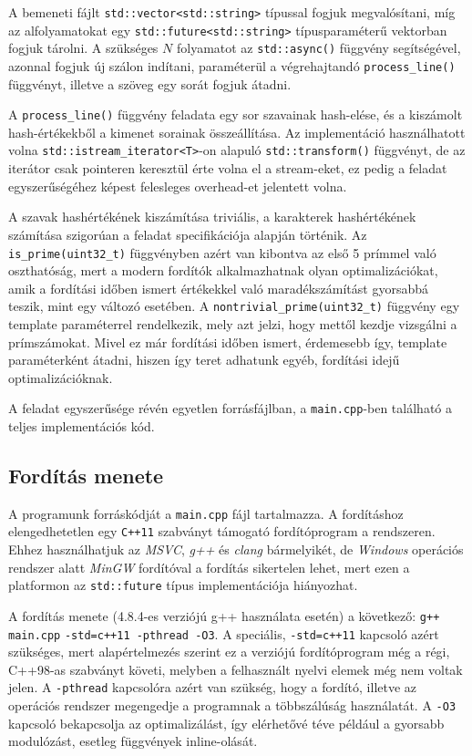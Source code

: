\documentclass[12pt]{article}
\begin{document}
A bemeneti fájlt \verb|std::vector<std::string>| típussal fogjuk megvalósítani,
míg az alfolyamatokat egy \verb|std::future<std::string>| típusparaméterű vektorban
fogjuk tárolni. A szükséges $N$ folyamatot az \verb|std::async()| függvény
segítségével, azonnal fogjuk új szálon indítani, paraméterül a végrehajtandó
\verb|process_line()| függvényt, illetve a szöveg egy sorát fogjuk átadni.

A \verb|process_line()| függvény feladata egy sor szavainak hash-elése, és a kiszámolt
hash-értékekből a kimenet sorainak összeállítása. Az implementáció használhatott volna
\verb|std::istream_iterator<T>|-on alapuló \verb|std::transform()| függvényt,
de az iterátor csak pointeren keresztül érte volna el a stream-eket, ez pedig a
feladat egyszerűségéhez képest felesleges overhead-et jelentett volna.

A szavak hashértékének kiszámítása triviális, a karakterek hashértékének számítása
szigorúan a feladat specifikációja alapján történik. Az \verb|is_prime(uint32_t)|
függvényben azért van kibontva az első 5 prímmel való oszthatóság, mert a modern
fordítók alkalmazhatnak olyan optimalizációkat, amik a fordítási időben ismert
értékekkel való maradékszámítást gyorsabbá teszik, mint egy változó esetében.
A \verb|nontrivial_prime(uint32_t)| függvény egy template paraméterrel rendelkezik,
mely azt jelzi, hogy mettől kezdje vizsgálni a prímszámokat. Mivel ez már fordítási
időben ismert, érdemesebb így, template paraméterként átadni, hiszen így teret
adhatunk egyéb, fordítási idejű optimalizációknak.

A feladat egyszerűsége révén egyetlen forrásfájlban, a \verb|main.cpp|-ben található a teljes implementációs kód.

\subsection{Fordítás menete}

A programunk forráskódját a \verb|main.cpp| fájl tartalmazza. A fordításhoz
elengedhetetlen egy \verb|C++11| szabványt támogató fordítóprogram a rendszeren.
Ehhez használhatjuk az \textit{MSVC}, \textit{g++} és \textit{clang} bármelyikét,
de \textit{Windows} operációs rendszer alatt \textit{MinGW} fordítóval a fordítás sikertelen lehet,
mert ezen a platformon az \verb|std::future| típus implementációja hiányozhat.

A fordítás menete (4.8.4-es verziójú g++ használata esetén) a következő:  \verb|g++ main.cpp|
\verb|-std=c++11 -pthread -O3|.
A speciális, \verb|-std=c++11| kapcsoló azért
szükséges, mert alapértelmezés szerint ez a verziójú fordítóprogram még a régi, C++98-as
szabványt követi, melyben a felhasznált nyelvi elemek még nem voltak jelen.
A \verb|-pthread| kapcsolóra azért van szükség, hogy a fordító, illetve az operációs
rendszer megengedje a programnak a többszálúság használatát. A \verb|-O3| kapcsoló
bekapcsolja az optimalizálást, így elérhetővé téve például a gyorsabb modulózást,
esetleg függvények inline-olását.
\end{document}
